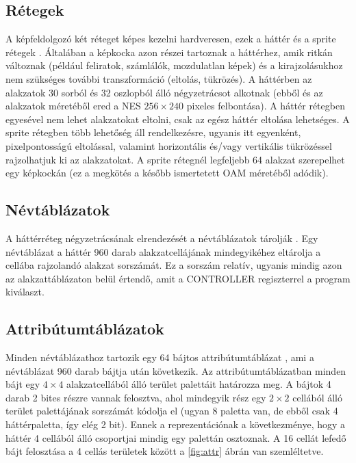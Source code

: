 \subsection{Rétegek}
A képfeldolgozó két réteget képes kezelni hardveresen, ezek a háttér és a sprite rétegek \cite{ppuref}.
Általában a képkocka azon részei tartoznak a háttérhez, amik ritkán változnak (például feliratok, számlálók, mozdulatlan képek) és a kirajzolásukhoz nem szükséges további transzformáció (eltolás, tükrözés). A háttérben az alakzatok 30 sorból és 32 oszlopból álló négyzetrácsot alkotnak (ebből és az alakzatok méretéből ered a NES $256\times 240$ pixeles felbontása).
A háttér rétegben egyesével nem lehet alakzatokat eltolni, csak az egész háttér eltolása lehetséges. A sprite rétegben több lehetőség áll rendelkezésre, ugyanis itt egyenként, pixelpontosságú eltolással, valamint horizontális és/vagy vertikális tükrözéssel rajzolhatjuk ki az alakzatokat. A sprite rétegnél legfeljebb 64 alakzat szerepelhet egy képkockán (ez a megkötés a később ismertetett OAM méretéből adódik).  

\subsection{Névtáblázatok}

A háttérréteg négyzetrácsának elrendezését a névtáblázatok tárolják \cite{ppuref}. Egy névtáblázat a háttér 960 darab alakzatcellájának mindegyikéhez eltárolja a cellába rajzolandó alakzat sorszámát. Ez a sorszám relatív, ugyanis mindig azon az alakzattáblázaton belül értendő, amit a CONTROLLER regiszterrel a program kiválaszt.

\subsection{Attribútumtáblázatok}

Minden névtáblázathoz tartozik egy 64 bájtos attribútumtáblázat \cite{ppuref}, ami a névtáblázat 960 darab bájtja után következik. Az attribútumtáblázatban minden bájt egy $4\times 4$ alakzatcellából álló terület palettáit határozza meg. A bájtok 4 darab 2 bites részre vannak felosztva, ahol mindegyik rész egy $2\times 2$ cellából álló terület palettájának sorszámát kódolja el (ugyan 8 paletta van, de ebből csak 4 háttérpaletta, így elég 2 bit). Ennek a reprezentációnak a következménye, hogy a háttér 4 cellából álló csoportjai mindig egy palettán osztoznak. A 16 cellát lefedő bájt felosztása a 4 cellás területek között a \ref{fig:attr} ábrán van szemléltetve.

